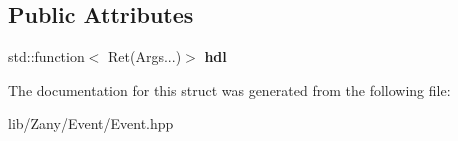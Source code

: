 \subsection*{Public Attributes}
\begin{DoxyCompactItemize}
\item 
\mbox{\label{structzany_1_1evt_1_1_event_1_1_evt_hdl_block_a7df5000b89aa94727b9f4ce1ccf55510}} 
std\+::function$<$ Ret(Args...)$>$ {\bfseries hdl}
\end{DoxyCompactItemize}


The documentation for this struct was generated from the following file\+:\begin{DoxyCompactItemize}
\item 
lib/\+Zany/\+Event/Event.\+hpp\end{DoxyCompactItemize}
